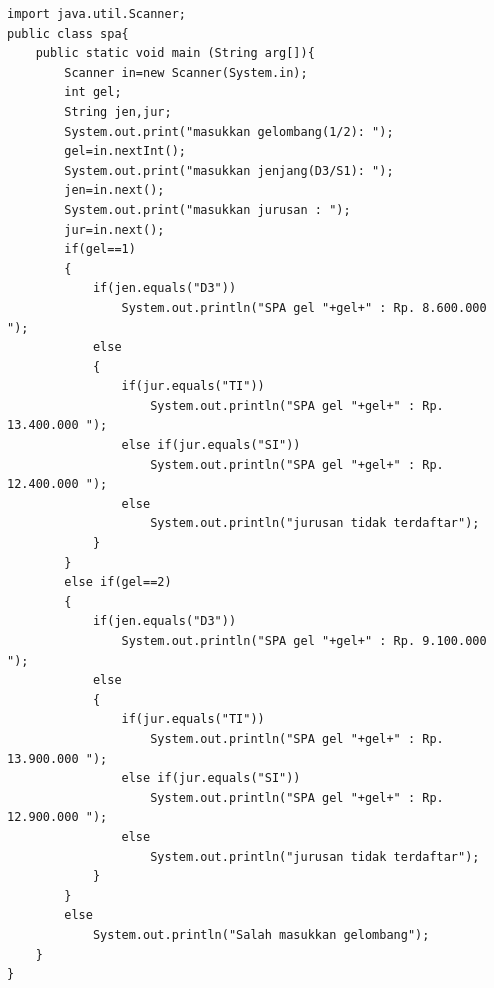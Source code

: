 \documentclass[a4paper,12pt]{article}
\begin{document}
\begin{enumerate}[label=\textbf{\arabic* .}]
            \begin{lstlisting}
import java.util.Scanner;
public class spa{
    public static void main (String arg[]){
        Scanner in=new Scanner(System.in);
        int gel;
        String jen,jur;
        System.out.print("masukkan gelombang(1/2): ");
        gel=in.nextInt();
        System.out.print("masukkan jenjang(D3/S1): ");
        jen=in.next();
        System.out.print("masukkan jurusan : ");
        jur=in.next();
        if(gel==1)
        {
            if(jen.equals("D3"))
                System.out.println("SPA gel "+gel+" : Rp. 8.600.000 ");
            else
            {
                if(jur.equals("TI"))
                    System.out.println("SPA gel "+gel+" : Rp. 13.400.000 ");
                else if(jur.equals("SI"))
                    System.out.println("SPA gel "+gel+" : Rp. 12.400.000 ");
                else
                    System.out.println("jurusan tidak terdaftar");
            }
        }
        else if(gel==2)
        {
            if(jen.equals("D3"))
                System.out.println("SPA gel "+gel+" : Rp. 9.100.000 ");
            else
            {
                if(jur.equals("TI"))
                    System.out.println("SPA gel "+gel+" : Rp. 13.900.000 ");
                else if(jur.equals("SI"))
                    System.out.println("SPA gel "+gel+" : Rp. 12.900.000 ");
                else
                    System.out.println("jurusan tidak terdaftar");
            }
        }
        else
            System.out.println("Salah masukkan gelombang");
    }
}               
            \end{lstlisting}
    \end{enumerate}
\end{document}
